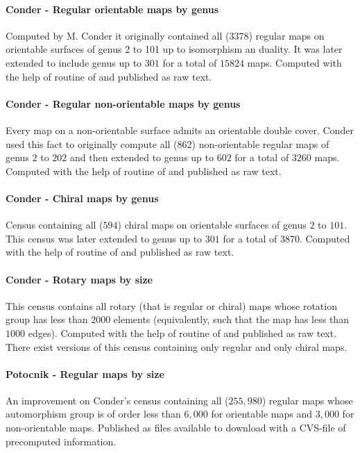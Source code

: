 \paragraph{Conder - Regular orientable maps by genus} Computed by M. Conder it originally contained all ($3378$) regular maps on orientable surfaces of genus 2 to 101 up to isomorphism an duality. It was later extended to include genus up to $301$ for a total of $15824$ maps.
Computed with the help of \lins routine of \magma and published as raw text.

\paragraph{Conder - Regular non-orientable maps by genus} Every map on a non-orientable surface admits an orientable double cover. Conder used this fact to originally compute all ($862$) non-orientable regular maps of genus $2$ to $202$ and then extended to genus up to $602$ for a total of $3260$ maps.
Computed with the help of \lins routine of \magma and published as raw text.

\paragraph{Conder - Chiral maps by genus } Census containing all ($594$) chiral maps on orientable surfaces of genus $2$ to $101$. This census was later extended to genus up to $301$ for a total of $3870$.
Computed with the help of \lins routine of \magma and published as raw text.
%
\paragraph{Conder - Rotary maps by size} This census contains all rotary (that is regular or chiral) maps whose rotation group has less than $2000$ elements (equivalently, such that the map has less than $1000$ edges).
Computed with the help of \lins routine of \magma and published as raw text. There exist versions of this census containing only regular and only chiral maps.
%
\paragraph{Potocnik - Regular maps by size} An improvement on Conder's census containing all ($255,980$) regular maps whose automorphism group is of order less than $6,000$ for orientable maps and $3,000$ for non-orientable maps. Published as \magma files available to download with a CVS-file of precomputed information.
%
